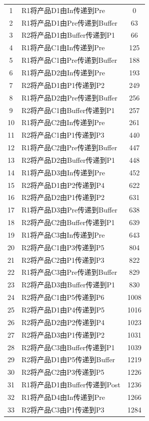 \documentclass{ctexart}
\begin{document}
{{\begin{longtable}{clc}
1 & R1将产品D1由In传递到Pre & 0 \\
2 & R1将产品D1由Pre传递到Buffer & 63 \\
3 & R2将产品D1由Buffer传递到P1 & 66 \\
4 & R1将产品C1由In传递到Pre & 125 \\
5 & R1将产品C1由Pre传递到Buffer & 188 \\
6 & R1将产品D2由In传递到Pre & 193 \\
7 & R2将产品D1由P1传递到P2 & 249 \\
8 & R1将产品D2由Pre传递到Buffer & 256 \\
9 & R2将产品C1由Buffer传递到P1 & 257 \\
10 & R1将产品C2由In传递到Pre & 261 \\
11 & R2将产品C1由P1传递到P3 & 440 \\
12 & R1将产品C2由Pre传递到Buffer & 447 \\
13 & R2将产品D2由Buffer传递到P1 & 448 \\
14 & R1将产品D3由In传递到Pre & 452 \\
15 & R2将产品D1由P2传递到P4 & 622 \\
16 & R2将产品D2由P1传递到P2 & 631 \\
17 & R1将产品D3由Pre传递到Buffer & 638 \\
18 & R2将产品C2由Buffer传递到P1 & 639 \\
19 & R1将产品C3由In传递到Pre & 643 \\
20 & R2将产品C1由P3传递到P5 & 804 \\
21 & R2将产品C2由P1传递到P3 & 822 \\
22 & R1将产品C3由Pre传递到Buffer & 829 \\
23 & R2将产品D3由Buffer传递到P1 & 830 \\
24 & R2将产品C1由P5传递到P6 & 1008 \\
25 & R2将产品D1由P4传递到P5 & 1016 \\
26 & R2将产品D2由P2传递到P4 & 1023 \\
27 & R2将产品D3由P1传递到P2 & 1031 \\
28 & R2将产品C3由Buffer传递到P1 & 1039 \\
29 & R2将产品D1由P5传递到Buffer & 1219 \\
30 & R2将产品C2由P3传递到P5 & 1226 \\
31 & R1将产品D1由Buffer传递到Post & 1236 \\
32 & R1将产品D4由In传递到Pre & 1266 \\
33 & R2将产品C3由P1传递到P3 & 1284 \\

\end{longtable}}}
\end{document}
